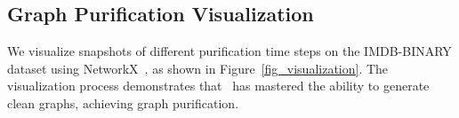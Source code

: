 \subsection{Graph Purification Visualization}
We visualize snapshots of different purification time steps on the IMDB-BINARY dataset using NetworkX~\cite{hagberg2008exploring}, as shown in Figure~\ref{fig_visualization}. The visualization process demonstrates that \ModelName\ has mastered the ability to generate clean graphs, achieving graph purification.

